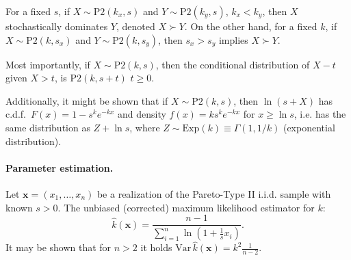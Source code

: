\documentclass[11pt]{article}\usepackage[]{graphicx}\usepackage[]{color}
\newcommand{\vect}[1]{{\mathbf{#1}}}
\theoremstyle{remark}
\theoremstyle{definition}
\begin{document}
For a fixed $s$, if $X\sim \mathrm{P2}(k_x,s)$ and $Y\sim \mathrm{P2}(k_y,s)$,
$k_x<k_y$, then $X$ stochastically dominates $Y$,
denoted $X\succ Y$.
On the other hand, for a fixed $k$, if $X\sim \mathrm{P2}(k,s_x)$
and $Y\sim \mathrm{P2}(k,s_y)$, then $s_x>s_y$ implies $X \succ Y$.

Most importantly, if $X\sim\mathrm{P2}(k,s)$,
then the conditional distribution of $X-t$ given $X>t$,
is $\mathrm{P2}(k,s+t)$ $t \ge 0$.

Additionally, it might be shown that if $X\sim\mathrm{P2}(k,s)$,
then $\ln(s+X)$ has c.d.f.~$F(x)=1-s^k e^{-kx}$ and
density $f(x)=k s^k e^{-kx}$ for $x\ge\ln s$,
i.e. has the same distribution as $Z+\ln s$, where
$Z\sim\mathrm{Exp}(k)\equiv \Gamma(1,1/k)$
(exponential distribution).




\paragraph{Parameter estimation.}
Let $\vect{x}=(x_1,\dots,x_n)$ be a realization of the Pareto-Type II
i.i.d. sample with known $s>0$.
The unbiased (corrected) maximum likelihood estimator for $k$:
%
\begin{equation*}
\widehat{k}(\vect{x})=\dfrac{n-1}{\sum_{i=1}^n \ln\left(1+\tfrac{1}{s} x_i\right)}.
\end{equation*}
It may be shown that for $n>2$ it holds
$\mathrm{Var}\,\widehat{k}(\vect{x})=k^2 \frac{1}{n-2}.$
\end{document}
